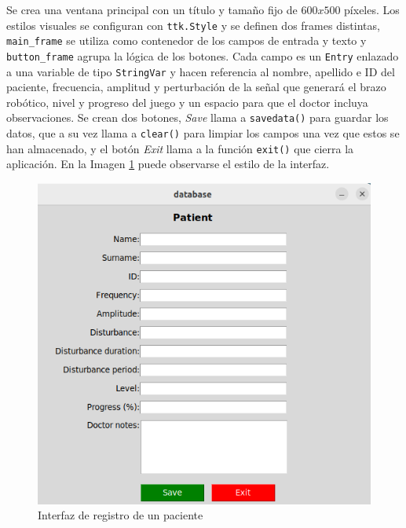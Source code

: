 Se crea una ventana principal con un título y tamaño fijo de $600x500$ píxeles.
Los estilos visuales se configuran con \verb|ttk.Style| y se definen dos frames distintas, \verb|main_frame| se utiliza como contenedor de los campos de entrada y texto y \verb|button_frame| agrupa la lógica de los botones.
Cada campo es un \verb|Entry| enlazado a una variable de tipo \verb|StringVar| y hacen referencia al nombre, apellido e ID del paciente, frecuencia, amplitud y perturbación de la señal que generará el brazo robótico, nivel y progreso del juego y un espacio para que el doctor incluya observaciones.
Se crean dos botones, \textit{Save} llama a \verb|savedata()| para guardar los datos, que a su vez llama a \verb|clear()| para limpiar los campos una vez que estos se han almacenado, y el botón \textit{Exit} llama a la función \verb|exit()| que cierra la aplicación.
En la Imagen \ref{fig:database} puede observarse el estilo de la interfaz.

\begin{figure}[ht!]
	\centering
	\begin{minipage}{0.65\linewidth}
		\centering
		\includegraphics[width=\linewidth]{figs/registro.png}
	\end{minipage}
	\caption[Interfaz de registro de un paciente]{Interfaz de registro de un paciente}
	\label{fig:database}
\end{figure}

